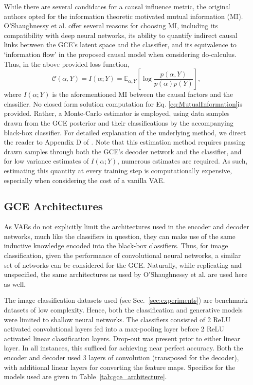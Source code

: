 While there are several candidates for a causal influence metric, the original authors opted for the information theoretic motivated mutual information (MI). O'Shaughnessy et al. offer several reasons for choosing MI, including its compatibility with deep neural networks, its ability to quantify indirect causal links between the GCE's latent space and the classifier, and its equivalence to `information flow' in the proposed causal model when considering do-calculus. Thus, in the above provided loss function,
\begin{equation}\label{eq:MutualInformation}
	\mathcal{C}(\alpha, Y)=I(\alpha;Y)=\mathbb{E}_{\alpha, Y}\left[\log \frac{p(\alpha,Y)}{p(\alpha)p(Y)}\right],
\end{equation}
where $I(\alpha;Y)$ is the aforementioned MI between the causal factors and the classifier. No closed form solution computation for Eq. \ref{eq:MutualInformation}is provided. Rather, a Monte-Carlo estimator is employed, using data samples drawn from the GCE posterior and their classifications by the accompanying black-box classifier. For detailed explanation of the underlying method, we direct the reader to Appendix D of \cite{oshaughnessy2020generative}. Note that this estimation method requires passing drawn samples through both the GCE's decoder network and the classifier, and for low variance estimates of $I(\alpha;Y)$, numerous estimates are required. As such, estimating this quantity at every training step is computationally expensive, especially when considering the cost of a vanilla VAE.

\subsection{GCE Architectures}\label{sec:gce}

As VAEs do not explicitly limit the architectures used in the encoder and decoder networks, much like the classifiers in question, they can make use of the same inductive knowledge encoded into the black-box classifiers. Thus, for image classification, given the performance of convolutional neural networks, a similar set of networks can be considered for the GCE. Naturally, while replicating and unspecified, the same architectures as used by O'Shaughnessy et al. are used here as well.

The image classification datasets used (see Sec.~\ref{sec:experiments}) are benchmark datasets of low complexity. Hence, both the classification and generative models were limited to shallow neural networks. The classifiers consisted of 2 ReLU activated convolutional layers fed into a max-pooling layer before 2 ReLU activated linear classification layers. Drop-out was present prior to either linear layer. In all instances, this sufficed for achieving near perfect accuracy. Both the encoder and decoder used 3 layers of convolution (transposed for the decoder), with additional linear layers for converting the feature maps. Specifics for the models used are given in Table~\ref{tab:gce_architecture}.

